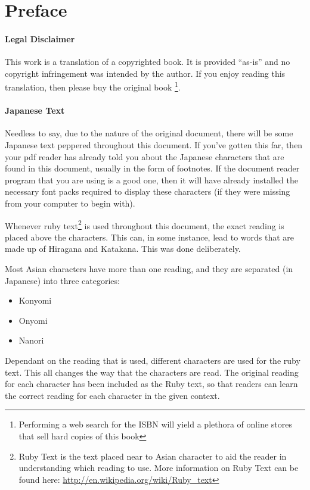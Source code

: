 \chapter*{Preface}
\subsubsection{Legal Disclaimer}
This work is a translation of a copyrighted book. It is provided ``as-is'' and no copyright infringement was intended by the author. If you enjoy reading this translation, then please buy the original book \footnote{Performing a web search for the ISBN will yield a plethora of online stores that sell hard copies of this book}.
\subsubsection{Japanese Text}
Needless to say, due to the nature of the original document, there will be some Japanese text peppered throughout this document. If you've gotten this far, then your pdf reader has already told you about the Japanese characters that are found in this document, usually in the form of footnotes. If the document reader program that you are using is a good one, then it will have already installed the necessary font packs required to display these characters (if they were missing from your computer to begin with).
\par Whenever ruby text\footnote{Ruby Text is the text placed near to Asian character to aid the reader in understanding which reading to use. More information on Ruby Text can be found here: \url{http://en.wikipedia.org/wiki/Ruby_text}} is used throughout this document, the exact reading is placed above the characters. This can, in some instance, lead to words that are made up of Hiragana and Katakana. This was done deliberately.
\par Most Asian characters have more than one reading, and they are separated (in Japanese) into three categories:
\begin{itemize}
\item Konyomi
\item Onyomi
\item Nanori
\end{itemize}
Dependant on the reading that is used, different characters are used for the ruby text. This all changes the way that the characters are read. The original reading for each character has been  included as the Ruby text, so that readers can learn the correct reading for each character in the given context.